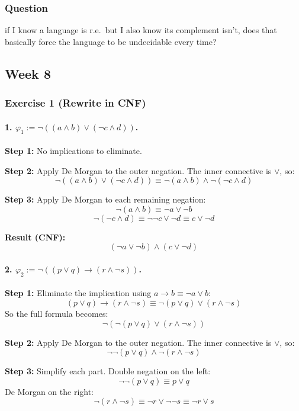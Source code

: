 \documentclass{article}
\theoremstyle{theorem}
\theoremstyle{definition}
\theoremstyle{remark}
\begin{document}
\subsubsection*{Question}
if I know a language is r.e.\ but I also know its complement isn't, does that basically force the language to be undecidable every time? 

\subsection{Week 8}\label{sec:week8}

\subsubsection*{Exercise 1 (Rewrite in CNF)}

\paragraph{1. $\varphi_1 := \neg((a \land b) \lor (\neg c \land d))$.}

\textbf{Step 1:} No implications to eliminate.

\textbf{Step 2:} Apply De Morgan to the outer negation. The inner connective is $\lor$, so:
\[
\neg((a \land b) \lor (\neg c \land d)) \equiv \neg(a \land b) \land \neg(\neg c \land d)
\]

\textbf{Step 3:} Apply De Morgan to each remaining negation:
\[
\neg(a \land b) \equiv \neg a \lor \neg b
\]
\[
\neg(\neg c \land d) \equiv \neg\neg c \lor \neg d \equiv c \lor \neg d
\]

\textbf{Result (CNF):}
\[
(\neg a \lor \neg b) \land (c \lor \neg d)
\]

\paragraph{2. $\varphi_2 := \neg((p \lor q) \to (r \land \neg s))$.}

\textbf{Step 1:} Eliminate the implication using $a \to b \equiv \neg a \lor b$:
\[
(p \lor q) \to (r \land \neg s) \equiv \neg(p \lor q) \lor (r \land \neg s)
\]
So the full formula becomes:
\[
\neg(\neg(p \lor q) \lor (r \land \neg s))
\]

\textbf{Step 2:} Apply De Morgan to the outer negation. The inner connective is $\lor$, so:
\[
\neg\neg(p \lor q) \land \neg(r \land \neg s)
\]

\textbf{Step 3:} Simplify each part. Double negation on the left:
\[
\neg\neg(p \lor q) \equiv p \lor q
\]
De Morgan on the right:
\[
\neg(r \land \neg s) \equiv \neg r \lor \neg\neg s \equiv \neg r \lor s
\]
\end{document}
